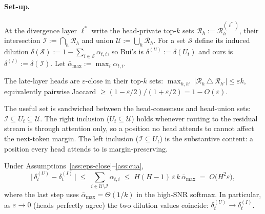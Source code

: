 \paragraph{Set-up.} At the divergence layer $\ell^*$ write the head-private
top-$k$ sets $\mathcal{R}_h:=\mathcal{R}^{(\ell^*)}_h$, their intersection
$\mathcal{I}:=\bigcap_h\mathcal{R}_h$ and union
$\mathcal{U}:=\bigcup_h\mathcal{R}_h$. For a set $\mathcal{S}$ define its
induced dilution $\delta(\mathcal{S}):=1-\sum_{i\in\mathcal{S}}\alpha_{t,i}$, so
Bui's is $\delta^{(U)}:=\delta(U_t)$ and ours is
$\delta^{(I)}:=\delta(\mathcal{I})$. Let $\bar\alpha_{\max}:=\max_i\alpha_{t,i}$.

\begin{assumption}
\label{ass:eps-close}
The late-layer heads are $\varepsilon$-close in their top-$k$ sets:
$\max_{h,h'}\,|\mathcal{R}_h\,\triangle\,\mathcal{R}_{h'}|\le\varepsilon k$,
equivalently pairwise Jaccard $\ge (1-\varepsilon/2)/(1+\varepsilon/2)=1-O(\varepsilon)$.
\end{assumption}

\begin{assumption}
\label{ass:cua}
The useful set is sandwiched between the head-consensus and head-union sets:
$\mathcal{I}\subseteq U_t\subseteq\mathcal{U}$. The right inclusion
($U_t\subseteq\mathcal{U}$) holds whenever routing to the residual stream is
through attention only, so a position no head attends to cannot affect the
next-token margin. The left inclusion ($\mathcal{I}\subseteq U_t$) is the
substantive content: a position every head attends to is margin-preserving.
\end{assumption}

\begin{proposition}
\label{prop:a4}
Under Assumptions~\ref{ass:eps-close}--\ref{ass:cua},
\begin{equation}
\label{eq:a4-bound}
\bigl|\,\delta^{(U)}_t-\delta^{(I)}_t\,\bigr|
\;\le\;\sum_{i\in\mathcal{U}\setminus\mathcal{I}}\alpha_{t,i}
\;\le\; H(H-1)\,\varepsilon\,k\,\bar\alpha_{\max}
\;=\; O\!\bigl(H^2\varepsilon\bigr),
\end{equation}
where the last step uses $\bar\alpha_{\max}=\Theta(1/k)$ in the high-SNR
softmax. In particular, as $\varepsilon\to0$ (heads perfectly agree) the two
dilution values coincide: $\delta^{(U)}_t\to\delta^{(I)}_t$.
\end{proposition}

